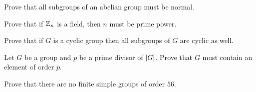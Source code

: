 \documentclass{pset}
\begin{document}
	\begin{problems}
		\begin{problem}[5 points]
			Prove that all subgroups of an abelian group must be normal.
		\end{problem}

		\begin{problem}[5 points]
			Prove that if $\Z_n$ is a field, then $n$ must be prime power.
		\end{problem}

		\begin{problem}[10 points]
			Prove that if $G$ is a cyclic group then all subgroups of $G$ are cyclic as well.
		\end{problem}

		\begin{problem}[10 points]
			Let $G$ be a group and $p$ be a prime divisor of $\abs{G}$. Prove that $G$ must contain an element of order $p$.
		\end{problem}

		\begin{problem}[5 points]
			Prove that there are no finite simple groups of order $56$.
		\end{problem}
	\end{problems}
\end{document}
